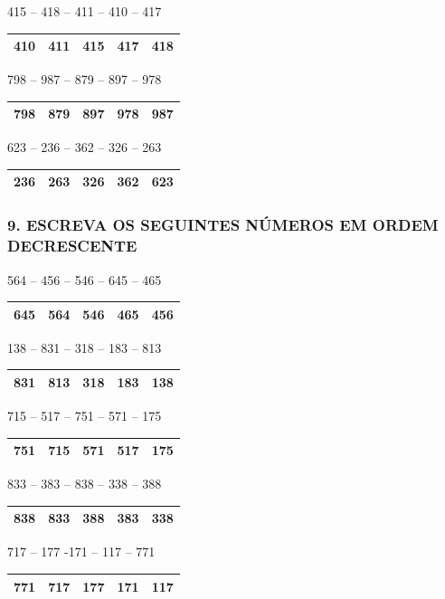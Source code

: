 415 -- 418 -- 411 -- 410 -- 417

\begin{longtable}[]{@{}lllll@{}}
\toprule
410 & 411 & 415 & 417 & 418\tabularnewline
\bottomrule
\end{longtable}

798 -- 987 -- 879 -- 897 -- 978

\begin{longtable}[]{@{}lllll@{}}
\toprule
798 & 879 & 897 & 978 & 987\tabularnewline
\bottomrule
\end{longtable}

623 -- 236 -- 362 -- 326 -- 263

\begin{longtable}[]{@{}lllll@{}}
\toprule
236 & 263 & 326 & 362 & 623\tabularnewline
\bottomrule
\end{longtable}

\subsubsection{9. ESCREVA OS SEGUINTES NÚMEROS EM ORDEM
DECRESCENTE}\label{escreva-os-seguintes-nuxfameros-em-ordem-decrescente}

564 -- 456 -- 546 -- 645 -- 465

\begin{longtable}[]{@{}lllll@{}}
\toprule
645 & 564 & 546 & 465 & 456\tabularnewline
\bottomrule
\end{longtable}

138 -- 831 -- 318 -- 183 -- 813

\begin{longtable}[]{@{}lllll@{}}
\toprule
831 & 813 & 318 & 183 & 138\tabularnewline
\bottomrule
\end{longtable}

715 -- 517 -- 751 -- 571 -- 175

\begin{longtable}[]{@{}lllll@{}}
\toprule
751 & 715 & 571 & 517 & 175\tabularnewline
\bottomrule
\end{longtable}

833 -- 383 -- 838 -- 338 -- 388

\begin{longtable}[]{@{}lllll@{}}
\toprule
838 & 833 & 388 & 383 & 338\tabularnewline
\bottomrule
\end{longtable}

717 -- 177 -171 -- 117 -- 771

\begin{longtable}[]{@{}lllll@{}}
\toprule
771 & 717 & 177 & 171 & 117\tabularnewline
\bottomrule
\end{longtable}

